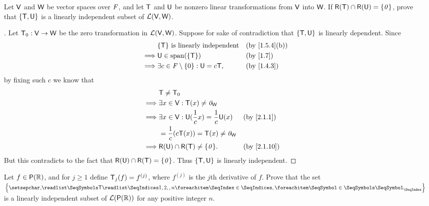 \begin{ex}\label{ex:2.2.13}
  Let \(\mathsf{V}\) and \(\mathsf{W}\) be vector spaces over \(\mathit{F}\), and let \(\mathsf{T}\) and \(\mathsf{U}\) be nonzero linear transformations from \(\mathsf{V}\) into \(\mathsf{W}\).
  If \(\rg{\T} \cap \rg{\U} = \set{\zv}\), prove that \(\left\lbrace\mathsf{T}, \mathsf{U}\right\rbrace\) is a linearly independent subset of \(\mathcal{L}(\mathsf{V}, \mathsf{W})\).
\end{ex}

\begin{proof}[]
  Let \(\mathsf{T}_0 : \mathsf{V} \to \mathsf{W}\) be the zero transformation in \(\mathcal{L}(\mathsf{V}, \mathsf{W})\).
  Suppose for sake of contradiction that \(\left\lbrace\mathsf{T}, \mathsf{U}\right\rbrace\) is linearly dependent.
  Since
  \begin{align*}
             & \set{\T} \text{ is linearly independent}        &  & \text{(by \cref{1.5.4}(b))} \\
    \implies & \U \in \spn{\set{\T}}                           &  & \text{(by \cref{1.7})}      \\
    \implies & \exists c \in \F \setminus \set{0} : \U = c \T, &  & \text{(by \cref{1.4.3})}
  \end{align*}
  by fixing such \(c\) we know that
  \begin{align*}
             & \T \neq \zT                                                                             \\
    \implies & \exists x \in \V : \T(x) \neq \zv_{\W}                                                  \\
    \implies & \exists x \in \V : \U(\frac{1}{c} x) = \frac{1}{c} \U(x) &  & \text{(by \cref{2.1.1})}  \\
             & = \frac{1}{c} (c \T(x)) = \T(x) \neq \zv_{\W}                                           \\
    \implies & \rg{\U} \cap \rg{\T} \neq \set{\zv}.                     &  & \text{(by \cref{2.1.10})}
  \end{align*}
  But this contradicts to the fact that \(\rg{\U} \cap \rg{\T} = \set{\zv}\).
  Thus \(\left\lbrace\mathsf{T}, \mathsf{U}\right\rbrace\) is linearly independent.
\end{proof}

\begin{ex}\label{ex:2.2.14}
  Let \(f \in \ps{\R}\), and for \(j \geq 1\) define \(\mathsf{T}_j(f) = f^{(j)}\), where \(f^{(j)}\) is the \(j\)th derivative of \(f\).
  Prove that the set \(\set{\seq{\T}{1,2,,n}}\) is a linearly independent subset of \(\ls(\ps{\R})\) for any positive integer \(n\).
\end{ex}

